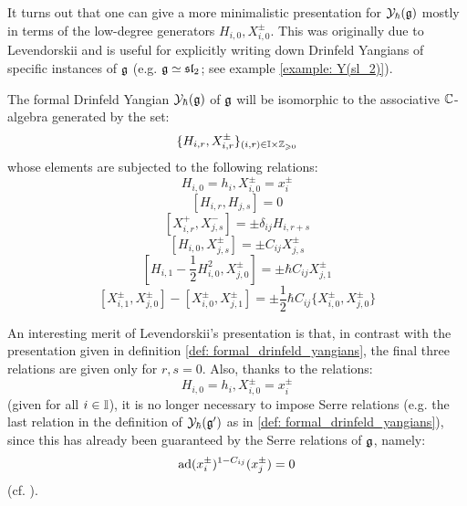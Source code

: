         It turns out that one can give a more minimalistic presentation for $\mathcal{Y}_{\hbar}(\mathfrak{g})$ mostly in terms of the low-degree generators $H_{i, 0}, X_{i, 0}^{\pm}$. This was originally due to Levendorskii and is useful for explicitly writing down Drinfeld Yangians of specific instances of $\mathfrak{g}$ (e.g. $\mathfrak{g} \simeq \mathfrak{sl}_2$; see example \ref{example: Y(sl_2)}).
        \begin{theorem} \label{theorem: levendorskii_presentation}
            \cite[Theorem 1.2]{levendorskii_finite_type_yangians_presentation} The formal Drinfeld Yangian $\mathcal{Y}_{\hbar}(\mathfrak{g})$ of $\mathfrak{g}$ will be isomorphic to the associative $\mathbb{C}$-algebra generated by the set:
                $$\{ H_{i, r}, X_{i, r}^{\pm} \}_{(i, r) \in \simpleroots \x \Z_{\geq 0}}$$
            whose elements are subjected to the following relations:
                $$H_{i, 0} = h_i, X_{i, 0}^{\pm} = x_i^{\pm}$$
                $$[ H_{i, r}, H_{j, s} ] = 0$$
                $$[ X_{i, r}^+, X_{j, s}^- ] = \pm \delta_{ij} H_{i, r + s}$$
                $$[ H_{i, 0}, X_{j, s}^{\pm} ] = \pm C_{ij} X_{j, s}^{\pm}$$
                $$\left[ H_{i, 1} - \frac12 H_{i, 0}^2, X_{j, 0}^{\pm} \right] = \pm \hbar C_{ij} X_{j, 1}^{\pm}$$
                $$[ X_{i, 1}^{\pm}, X_{j, 0}^{\pm} ] - [ X_{i, 0}^{\pm}, X_{j, 1}^{\pm} ] = \pm \frac12 \hbar C_{ij} \{X_{i, 0}^{\pm}, X_{j, 0}^{\pm}\}$$
        \end{theorem}
        \begin{remark}
            An interesting merit of Levendorskii's presentation is that, in contrast with the presentation given in definition \ref{def: formal_drinfeld_yangians}, the final three relations are given only for $r, s = 0$. Also, thanks to the relations:
                $$H_{i, 0} = h_i, X_{i, 0}^{\pm} = x_i^{\pm}$$
            (given for all $i \in \mathbb{I}$), it is no longer necessary to impose Serre relations (e.g. the last relation in the definition of $\mathcal{Y}_{\hbar}(\mathfrak{g}')$ as in \ref{def: formal_drinfeld_yangians}), since this has already been guaranteed by the Serre relations of $\mathfrak{g}$, namely:
                $$\mathrm{ad}(x_i^{\pm})^{1 - C_{ij}}( x_j^{\pm} ) = 0$$
            (cf. \cite{humphreys_lie_algebras}).
        \end{remark}
